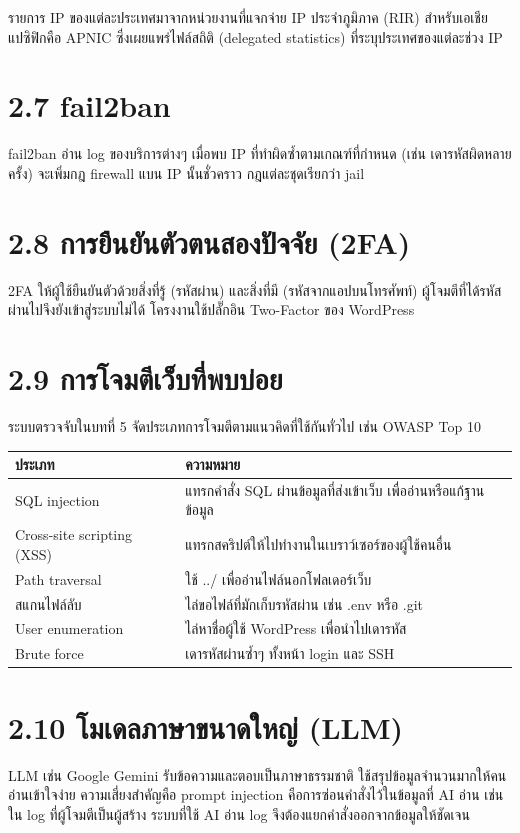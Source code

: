 รายการ IP ของแต่ละประเทศมาจากหน่วยงานที่แจกจ่าย IP ประจำภูมิภาค (RIR) สำหรับเอเชียแปซิฟิกคือ APNIC ซึ่งเผยแพร่ไฟล์สถิติ (delegated statistics) ที่ระบุประเทศของแต่ละช่วง IP

\section*{2.7 fail2ban}

fail2ban อ่าน log ของบริการต่างๆ เมื่อพบ IP ที่ทำผิดซ้ำตามเกณฑ์ที่กำหนด (เช่น เดารหัสผิดหลายครั้ง) จะเพิ่มกฎ firewall แบน IP นั้นชั่วคราว กฎแต่ละชุดเรียกว่า jail

\section*{2.8 การยืนยันตัวตนสองปัจจัย (2FA)}

2FA ให้ผู้ใช้ยืนยันตัวด้วยสิ่งที่รู้ (รหัสผ่าน) และสิ่งที่มี (รหัสจากแอปบนโทรศัพท์) ผู้โจมตีที่ได้รหัสผ่านไปจึงยังเข้าสู่ระบบไม่ได้ โครงงานใช้ปลั๊กอิน Two-Factor ของ WordPress

\section*{2.9 การโจมตีเว็บที่พบบ่อย}

ระบบตรวจจับในบทที่ 5 จัดประเภทการโจมตีตามแนวคิดที่ใช้กันทั่วไป เช่น OWASP Top 10

\begingroup\small\begin{longtable}[]{@{}>{\raggedright\arraybackslash}p{}>{\raggedright\arraybackslash}p{}@{}}
\toprule\noalign{}
ประเภท & ความหมาย \\
\midrule\noalign{}
\endhead
\bottomrule\noalign{}
\endlastfoot
SQL injection & แทรกคำสั่ง SQL ผ่านข้อมูลที่ส่งเข้าเว็บ เพื่ออ่านหรือแก้ฐานข้อมูล \\
Cross-site scripting (XSS) & แทรกสคริปต์ให้ไปทำงานในเบราว์เซอร์ของผู้ใช้คนอื่น \\
Path traversal & ใช้ ../ เพื่ออ่านไฟล์นอกโฟลเดอร์เว็บ \\
สแกนไฟล์ลับ & ไล่ขอไฟล์ที่มักเก็บรหัสผ่าน เช่น .env หรือ .git \\
User enumeration & ไล่หาชื่อผู้ใช้ WordPress เพื่อนำไปเดารหัส \\
Brute force & เดารหัสผ่านซ้ำๆ ทั้งหน้า login และ SSH \\
\end{longtable}\endgroup

\section*{2.10 โมเดลภาษาขนาดใหญ่ (LLM)}

LLM เช่น Google Gemini รับข้อความและตอบเป็นภาษาธรรมชาติ ใช้สรุปข้อมูลจำนวนมากให้คนอ่านเข้าใจง่าย ความเสี่ยงสำคัญคือ prompt injection คือการซ่อนคำสั่งไว้ในข้อมูลที่ AI อ่าน เช่น ใน log ที่ผู้โจมตีเป็นผู้สร้าง ระบบที่ใช้ AI อ่าน log จึงต้องแยกคำสั่งออกจากข้อมูลให้ชัดเจน

